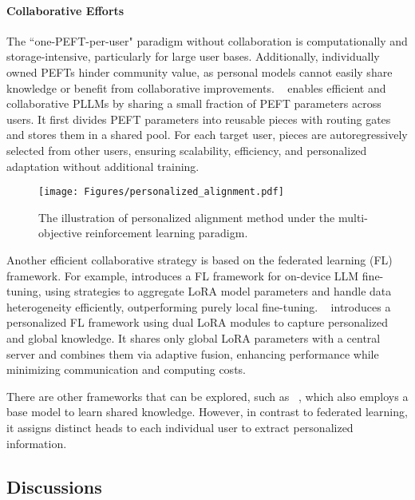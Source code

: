 \paragraph{Collaborative Efforts} 
The ``one-PEFT-per-user" paradigm without collaboration is computationally and storage-intensive, particularly for large user bases. Additionally, individually owned PEFTs hinder community value, as personal models cannot easily share knowledge or benefit from collaborative improvements.
~\citep{tan2024personalized} enables efficient and collaborative PLLMs by sharing a small fraction of PEFT parameters across users. It first divides PEFT parameters into reusable pieces with routing gates and stores them in a shared pool. For each target user, pieces are autoregressively selected from other users, ensuring scalability, efficiency, and personalized adaptation without additional training. 

\begin{figure*}[!t]
    \centering
    \texttt{[image: Figures/personalized\_alignment.pdf]}
    \caption{The illustration of personalized alignment method under the multi-objective reinforcement learning paradigm.}
    \label{fig:personalized_alignment}
\vspace{-10pt}
\end{figure*}


Another efficient collaborative strategy is based on the federated learning (FL) framework.
For example, 
\cite{wagner2024personalized} introduces a FL framework for on-device LLM fine-tuning, using strategies to aggregate LoRA model parameters and handle data heterogeneity efficiently, outperforming purely local fine-tuning. 
~\citep{qi2024fdlora} introduces a personalized FL framework using dual LoRA modules to capture personalized and global knowledge. It shares only global LoRA parameters with a central server and combines them via adaptive fusion, enhancing performance while minimizing communication and computing costs.

There are other frameworks that can be explored, such as ~\citep{zhuang2024hydra}, which also employs a base model to learn shared knowledge. However, in contrast to federated learning, it assigns distinct heads to each individual user to extract personalized information.



\subsection{Discussions}

